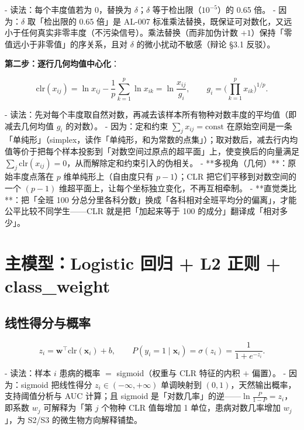 \documentclass{internal-report}
\begin{document}
- 读法：每个丰度值若为 0，替换为 $\delta$；$\delta$ 等于检出限（$10^{-5}$）的 0.65 倍。
- 因为：$\delta$ 取「检出限的 0.65 倍」是 AL-007 标准乘法替换，既保证可对数化，又远小于任何真实非零丰度（不污染信号）。乘法替换（而非加伪计数 $+1$）保持「零值远小于非零值」的序关系，且对 $\delta$ 的微小扰动不敏感（辩论 \S3.1 反驳）。

\textbf{第二步：逐行几何均值中心化}：

\begin{equation}
  \mathrm{clr}(x_{ij}) = \ln x_{ij} - \frac{1}{p}\sum_{k=1}^{p}\ln x_{ik}
  = \ln\frac{x_{ij}}{g_i},
  \qquad
  g_i = \Big(\prod_{k=1}^{p} x_{ik}\Big)^{1/p}.
  \label{eq:clr}
\end{equation}

- 读法：先对每个丰度取自然对数，再减去该样本所有物种对数丰度的平均值（即减去几何均值 $g_i$ 的对数）。
- 因为：定和约束 $\sum_j x_{ij} = \text{const}$ 在原始空间是一条「单纯形」（simplex，读作「单纯形，和为常数的点集」）；取对数后，减去行内均值等价于把每个样本投影到「对数空间过原点的超平面」上，使变换后的向量满足 $\sum_j \mathrm{clr}(x_{ij})=0$，从而解除定和约束引入的伪相关。
- **多视角（几何）**：原始丰度点落在 $p$ 维单纯形上（自由度只有 $p-1$）；CLR 把它们平移到对数空间的一个 $(p-1)$ 维超平面上，让每个坐标独立变化，不再互相牵制。
- **直觉类比**：把「全班 100 分总分里各科分数」换成「各科相对全班平均分的偏离」，才能公平比较不同学生——CLR 就是把「加起来等于 100 的成分」翻译成「相对多少」。

\section{主模型：Logistic 回归 + L2 正则 + class\_weight}

\subsection{线性得分与概率}

\begin{equation}
  z_i = \mathbf{w}^{\top}\mathrm{clr}(\mathbf{x}_i) + b,
  \qquad
  P(y_i=1\mid \mathbf{x}_i) = \sigma(z_i) = \frac{1}{1+e^{-z_i}}.
  \label{eq:logistic}
\end{equation}

- 读法：样本 $i$ 患病的概率 $=$ sigmoid（权重与 CLR 特征的内积 $+$ 偏置）。
- 因为：sigmoid 把线性得分 $z_i\in(-\infty,+\infty)$ 单调映射到 $(0,1)$，天然输出概率，支持阈值分析与 AUC 计算；且 sigmoid 是「对数几率」的逆——$\ln\frac{P}{1-P}=z_i$，即系数 $w_j$ 可解释为「第 $j$ 个物种 CLR 值每增加 1 单位，患病对数几率增加 $w_j$」，为 S2/S3 的微生物方向解释铺垫。
\end{document}
